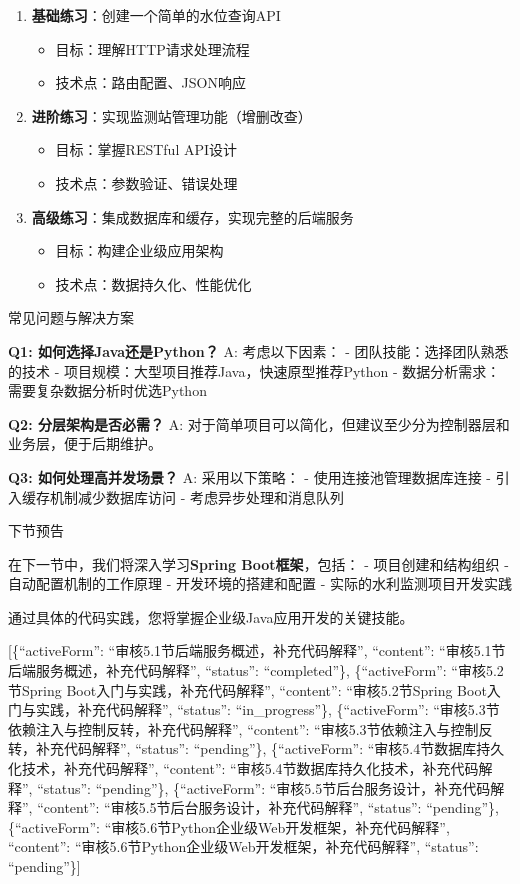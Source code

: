 \begin{enumerate}
\def\labelenumi{\arabic{enumi}.}
\tightlist
\item
  \textbf{基础练习}：创建一个简单的水位查询API

  \begin{itemize}
  \tightlist
  \item
    目标：理解HTTP请求处理流程
  \item
    技术点：路由配置、JSON响应
  \end{itemize}
\item
  \textbf{进阶练习}：实现监测站管理功能（增删改查）

  \begin{itemize}
  \tightlist
  \item
    目标：掌握RESTful API设计
  \item
    技术点：参数验证、错误处理
  \end{itemize}
\item
  \textbf{高级练习}：集成数据库和缓存，实现完整的后端服务

  \begin{itemize}
  \tightlist
  \item
    目标：构建企业级应用架构
  \item
    技术点：数据持久化、性能优化
  \end{itemize}
\end{enumerate}

 常见问题与解决方案

\textbf{Q1: 如何选择Java还是Python？} A: 考虑以下因素： - 团队技能：选择团队熟悉的技术 - 项目规模：大型项目推荐Java，快速原型推荐Python - 数据分析需求：需要复杂数据分析时优选Python

\textbf{Q2: 分层架构是否必需？} A: 对于简单项目可以简化，但建议至少分为控制器层和业务层，便于后期维护。

\textbf{Q3: 如何处理高并发场景？} A: 采用以下策略： - 使用连接池管理数据库连接 - 引入缓存机制减少数据库访问 - 考虑异步处理和消息队列

 下节预告

在下一节中，我们将深入学习\textbf{Spring Boot框架}，包括： - 项目创建和结构组织 - 自动配置机制的工作原理 - 开发环境的搭建和配置 - 实际的水利监测项目开发实践

通过具体的代码实践，您将掌握企业级Java应用开发的关键技能。

{[}\{``activeForm'': ``审核5.1节后端服务概述，补充代码解释'', ``content'': ``审核5.1节后端服务概述，补充代码解释'', ``status'': ``completed''\}, \{``activeForm'': ``审核5.2节Spring Boot入门与实践，补充代码解释'', ``content'': ``审核5.2节Spring Boot入门与实践，补充代码解释'', ``status'': ``in\_progress''\}, \{``activeForm'': ``审核5.3节依赖注入与控制反转，补充代码解释'', ``content'': ``审核5.3节依赖注入与控制反转，补充代码解释'', ``status'': ``pending''\}, \{``activeForm'': ``审核5.4节数据库持久化技术，补充代码解释'', ``content'': ``审核5.4节数据库持久化技术，补充代码解释'', ``status'': ``pending''\}, \{``activeForm'': ``审核5.5节后台服务设计，补充代码解释'', ``content'': ``审核5.5节后台服务设计，补充代码解释'', ``status'': ``pending''\}, \{``activeForm'': ``审核5.6节Python企业级Web开发框架，补充代码解释'', ``content'': ``审核5.6节Python企业级Web开发框架，补充代码解释'', ``status'': ``pending''\}{]}

